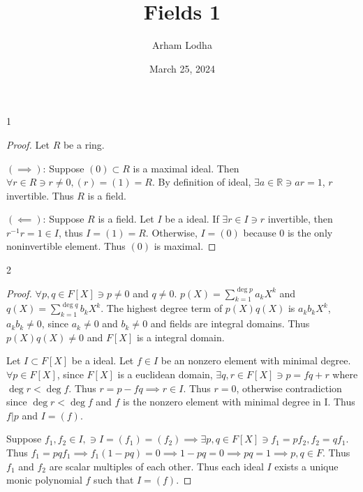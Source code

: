 \documentclass{article}
\newcommand{\R}{\mathbb{R}}
\begin{document}
\title{Fields 1}
\author{Arham Lodha}%
\date{March 25, 2024}%
\maketitle

\begin{PROB}{1}\label{Problem 1.}
\end{PROB}
\begin{proof}
    Let $R$ be a ring.
    
    $(\implies)$: Suppose $(0) \subset R$ is a maximal ideal. Then $\forall r \in R \ni r \neq 0, (r) = (1) = R$. By definition of ideal, $\exists a \in \R \ni ar = 1$, $r$ invertible. Thus $R$ is a field.
    
    $(\impliedby)$: Suppose $R$ is a field. Let $I$ be a ideal. If $\exists r \in I \ni r$ invertible, then $r^{-1}r = 1 \in I$, thus $I = (1) = R$. Otherwise, $I = (0)$ because 0 is the only noninvertible element. Thus $(0)$ is maximal.            
\end{proof}

\bigskip

\begin{PROB}{2}\label{Problem 2.}
\end{PROB}
\begin{proof}
    $\forall p, q \in F[X] \ni p \neq 0$ and $q \neq 0$. $p(X) = \sum_{k = 1}^{\deg p} a_k X^k$ and $q(X) = \sum_{k = 1}^{\deg q} b_k X^k$. The highest degree term of $p(X)q(X)$ is $a_kb_k X^k$, $a_kb_k \neq 0 $, since $a_k \neq 0$ and $b_k \neq 0$ and fields are integral domains. Thus $p(X)q(X) \neq 0$ and $F[X]$ is a integral domain.
    
    Let $I \subset F[X]$ be a ideal. Let $f \in I$ be an nonzero element with minimal degree. $\forall p \in F[X]$, since $F[X]$ is a euclidean domain, $\exists q, r \in F[X] \ni p = fq + r$ where $\deg r < \deg f$. Thus $r = p - fq \implies r \in I$. Thus $r = 0$, otherwise contradiction since $\deg r < \deg f$ and $f$ is the nonzero element with minimal degree in I. Thus $f | p$ and $I = (f)$. 
    
    Suppose $f_1, f_2 \in I, \ni I = (f_1) = (f_2) \implies \exists p, q \in F[X] \ni f_1 = pf_2, f_2 = qf_1$. Thus $f_1 = pqf_1 \implies f_1(1 - pq) = 0 \implies 1 - pq = 0 \implies pq = 1 \implies p, q \in F$. Thus $f_1$ and $f_2$ are scalar multiples of each other. Thus each ideal $I$ exists a unique monic polynomial $f$ such that $I = (f)$. 
\end{proof}
\end{document}
